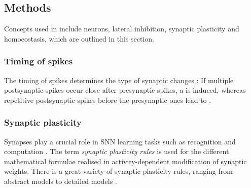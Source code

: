 \subsection{Methods}
\label{subsec:methods}


Concepts used in \cite{SNN} include  neurons, lateral inhibition, synaptic plasticity and homoeostasis, which are outlined in this section.


\subsubsection{Timing of spikes}
The timing of spikes determines the type of synaptic changes \cite{LTP_D_bio}:
If multiple postsynaptic spikes occur close after presynaptic spikes, a  is induced, 
whereas repetitive postsynaptic spikes before the presynaptic ones lead to .


\subsubsection{Synaptic plasticity}
Synapses play a crucial role in \ac{SNN} learning tasks such as recognition and computation \cite{Synaptic_plasticity}.
The term \textit{synaptic plasticity rules} is used for the different mathematical formulae realised in activity-dependent modification of synaptic weights.
There is a great variety of synaptic plasticity rules, ranging from abstract models to detailed models \cite{Synaptic_plasticity}.


